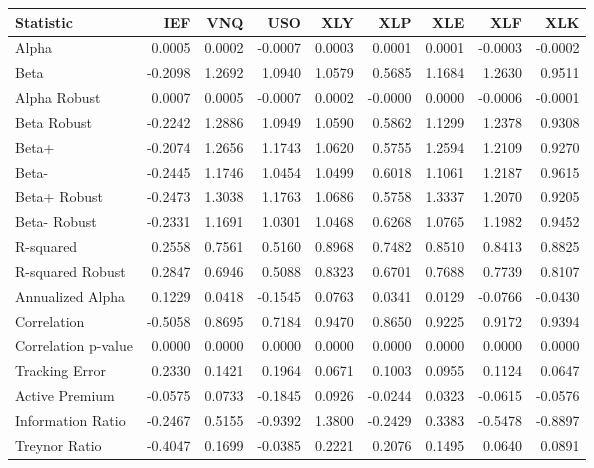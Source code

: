 \begin{tabular}{lrrrrrrrr}
\toprule
Statistic & IEF & VNQ & USO & XLY & XLP & XLE & XLF & XLK \\
\midrule
Alpha & 0.0005 & 0.0002 & -0.0007 & 0.0003 & 0.0001 & 0.0001 & -0.0003 & -0.0002 \\
Beta & -0.2098 & 1.2692 & 1.0940 & 1.0579 & 0.5685 & 1.1684 & 1.2630 & 0.9511 \\
Alpha Robust & 0.0007 & 0.0005 & -0.0007 & 0.0002 & -0.0000 & 0.0000 & -0.0006 & -0.0001 \\
Beta Robust & -0.2242 & 1.2886 & 1.0949 & 1.0590 & 0.5862 & 1.1299 & 1.2378 & 0.9308 \\
Beta+ & -0.2074 & 1.2656 & 1.1743 & 1.0620 & 0.5755 & 1.2594 & 1.2109 & 0.9270 \\
Beta- & -0.2445 & 1.1746 & 1.0454 & 1.0499 & 0.6018 & 1.1061 & 1.2187 & 0.9615 \\
Beta+ Robust & -0.2473 & 1.3038 & 1.1763 & 1.0686 & 0.5758 & 1.3337 & 1.2070 & 0.9205 \\
Beta- Robust & -0.2331 & 1.1691 & 1.0301 & 1.0468 & 0.6268 & 1.0765 & 1.1982 & 0.9452 \\
R-squared & 0.2558 & 0.7561 & 0.5160 & 0.8968 & 0.7482 & 0.8510 & 0.8413 & 0.8825 \\
R-squared Robust & 0.2847 & 0.6946 & 0.5088 & 0.8323 & 0.6701 & 0.7688 & 0.7739 & 0.8107 \\
Annualized Alpha & 0.1229 & 0.0418 & -0.1545 & 0.0763 & 0.0341 & 0.0129 & -0.0766 & -0.0430 \\
Correlation & -0.5058 & 0.8695 & 0.7184 & 0.9470 & 0.8650 & 0.9225 & 0.9172 & 0.9394 \\
Correlation p-value & 0.0000 & 0.0000 & 0.0000 & 0.0000 & 0.0000 & 0.0000 & 0.0000 & 0.0000 \\
Tracking Error & 0.2330 & 0.1421 & 0.1964 & 0.0671 & 0.1003 & 0.0955 & 0.1124 & 0.0647 \\
Active Premium & -0.0575 & 0.0733 & -0.1845 & 0.0926 & -0.0244 & 0.0323 & -0.0615 & -0.0576 \\
Information Ratio & -0.2467 & 0.5155 & -0.9392 & 1.3800 & -0.2429 & 0.3383 & -0.5478 & -0.8897 \\
Treynor Ratio & -0.4047 & 0.1699 & -0.0385 & 0.2221 & 0.2076 & 0.1495 & 0.0640 & 0.0891 \\
\bottomrule
\end{tabular}
